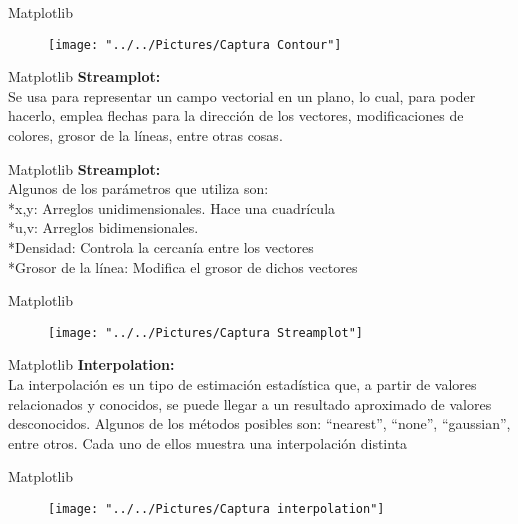 \documentclass{beamer}
\begin{document}
\begin{frame}{Matplotlib}
\begin{figure}
	\centering
	\texttt{[image: "../../Pictures/Captura Contour"]}
	\caption{}
	\label{fig:captura-contour}
\end{figure}

\end{frame}

\begin{frame}{Matplotlib}
	\textbf{Streamplot:}\\ Se usa para representar un campo vectorial en un plano, lo cual, para poder hacerlo, emplea flechas para la dirección de los vectores, modificaciones de colores, grosor de la líneas, entre otras cosas.
\end{frame}

\begin{frame}{Matplotlib}
	\textbf{Streamplot:}\\ Algunos de los parámetros que utiliza son:\\
	*x,y: Arreglos unidimensionales. Hace una cuadrícula\\
	*u,v: Arreglos bidimensionales. \\
	*Densidad: Controla la cercanía entre los vectores\\
	*Grosor de la línea: Modifica el grosor de dichos vectores\\
\end{frame}

\begin{frame}{Matplotlib}
	
\begin{figure}
	\centering
	\texttt{[image: "../../Pictures/Captura Streamplot"]}
	\caption{}
	\label{fig:captura-streamplot}
\end{figure}

\end{frame}

\begin{frame}{Matplotlib}
	\textbf{Interpolation:}\\ La interpolación es un tipo de estimación estadística que, a partir de valores relacionados y conocidos, se puede llegar a un resultado aproximado de valores desconocidos. Algunos de los métodos posibles son: “nearest”, “none”, “gaussian”, entre otros. Cada uno de ellos muestra una interpolación distinta
\end{frame}

\begin{frame}{Matplotlib}
\begin{figure}
	\centering
	\texttt{[image: "../../Pictures/Captura interpolation"]}
	\caption{}
	\label{fig:captura-interpolation}
\end{figure}
	
\end{frame}
\end{document}

